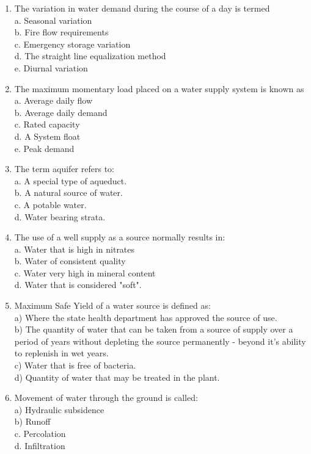 \documentclass{article}
\begin{document}
\begin{enumerate}
\item The variation in water demand during the course of a day is termed\\
a. Seasonal variation\\
b. Fire flow requirements\\
c. Emergency storage variation\\
d. The straight line equalization method\\
e. Diurnal variation\\

\item The maximum momentary load placed on a water supply system is known as\\
a. Average daily flow\\
b. Average daily demand\\
c. Rated capacity\\
d. A System float\\
e. Peak demand

\item The term aquifer refers to:\\
a. A special type of aqueduct.\\
b. A natural source of water.\\
c. A potable water.\\
d. Water bearing strata.\\


\item The use of a well supply as a source normally results in:\\
a. Water that is high in nitrates\\
b. Water of consistent quality\\
c. Water very high in mineral content\\
d. Water that is considered "soft".\\


\item Maximum Safe Yield of a water source is defined as:\\
a) Where the state health department has approved the source of use.\\
b) The quantity of water that can be taken from a source of supply over a period of years without depleting the source permanently - beyond it's ability to replenish in wet years.\\
c) Water that is free of bacteria.\\
d) Quantity of water that may be treated in the plant.\\

\item Movement of water through the ground is called:\\
a) Hydraulic subsidence\\
b) Runoff\\
c. Percolation\\
d. Infiltration\\



\end{enumerate}
\end{document}
